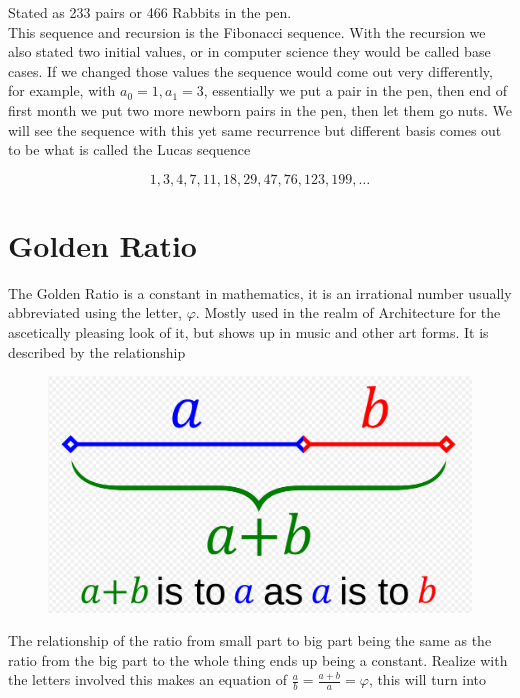 \documentclass{article}
\begin{document}
Stated as 233 pairs or 466 Rabbits in the pen. \\

This sequence and recursion is the Fibonacci sequence.  With the recursion we also stated two initial values, or in computer science they would be called base cases. If we changed those values the sequence would come out very differently, for example, with $a_0=1, a_1=3$, essentially we put a pair in the pen, then end of first month we put two more newborn pairs in the pen, then let them go nuts. We will see the sequence with this yet same recurrence but different basis comes out to be what is called the Lucas sequence

\begin{equation*}
    1,3,4,7,11,18,29,47,76,123,199,\ldots
\end{equation*}

\section{Golden Ratio}

The Golden Ratio is a constant in mathematics, it is an irrational number usually abbreviated using the letter, $\varphi$. Mostly used in the realm of Architecture for the ascetically pleasing look of it, but shows up in music and other art forms. It is described by the relationship

\begin{figure}[!htbp]
\centering
\includegraphics[scale=.2]{Golden.PNG}
\label{fig:3}
\end{figure}

The relationship of the ratio from small part to big part being the same as the ratio from the big part to the whole thing ends up being a constant. Realize with the letters involved this makes an equation of $\frac{a}{b}=\frac{a+b}{a}=\varphi$, this will turn into
\end{document}
